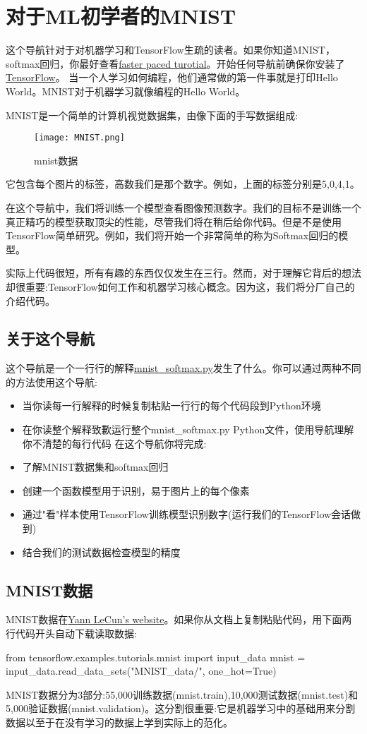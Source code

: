\section{对于ML初学者的MNIST}\label{sec:start}
这个导航针对于对机器学习和TensorFlow生疏的读者。如果你知道MNIST，softmax回归，你最好查看\href{https://www.tensorflow.org/get_started/mnist/pros}{faster paced turotial}。开始任何导航前确保你安装了\href{https://www.tensorflow.org/install/index}{TensorFlow}。
当一个人学习如何编程，他们通常做的第一件事就是打印Hello World。MNIST对于机器学习就像编程的Hello World。

MNIST是一个简单的计算机视觉数据集，由像下面的手写数据组成:
\begin{figure}[H]
\centering
\texttt{[image: MNIST.png]}
\caption{mnist数据}
\end{figure}
它包含每个图片的标签，高数我们是那个数字。例如，上面的标签分别是5,0,4,1。

在这个导航中，我们将训练一个模型查看图像预测数字。我们的目标不是训练一个真正精巧的模型获取顶尖的性能，尽管我们将在稍后给你代码。但是不是使用TensorFlow简单研究。例如，我们将开始一个非常简单的称为Softmax回归的模型。

实际上代码很短，所有有趣的东西仅仅发生在三行。然而，对于理解它背后的想法却很重要:TensorFlow如何工作和机器学习核心概念。因为这，我们将分厂自己的介绍代码。
\subsection{关于这个导航}
这个导航是一个一行行的解释\href{https://www.github.com/tensorflow/tensorflow/blob/r1.4/tensorflow/examples/tutorials/mnist/mnist_softmax.py}{mnist\_softmax.py}发生了什么。你可以通过两种不同的方法使用这个导航:
\begin{itemize}
\item 当你读每一行解释的时候复制粘贴一行行的每个代码段到Python环境
\item 在你读整个解释致歉运行整个mnist\_softmax.py Python文件，使用导航理解你不清楚的每行代码
在这个导航你将完成:
\item 了解MNIST数据集和softmax回归
\item 创建一个函数模型用于识别，易于图片上的每个像素
\item 通过"看"样本使用TensorFlow训练模型识别数字(运行我们的TensorFlow会话做到)
\item 结合我们的测试数据检查模型的精度
\end{itemize}
\subsection{MNIST数据}
MNIST数据在\href{http://yann.lecun.com/exdb/mnist/}{Yann LeCun's website}。如果你从文档上复制粘贴代码，用下面两行代码开头自动下载读取数据:
\begin{pythoncode}
from tensorflow.examples.tutorials.mnist import input_data
mnist = input_data.read_data_sets("MNIST_data/", one_hot=True)
\end{pythoncode}
MNIST数据分为3部分:55,000训练数据(mnist.train),10,000测试数据(mnist.test)和5,000验证数据(mnist.validation)。这分割很重要:它是机器学习中的基础用来分割数据以至于在没有学习的数据上学到实际上的范化。


